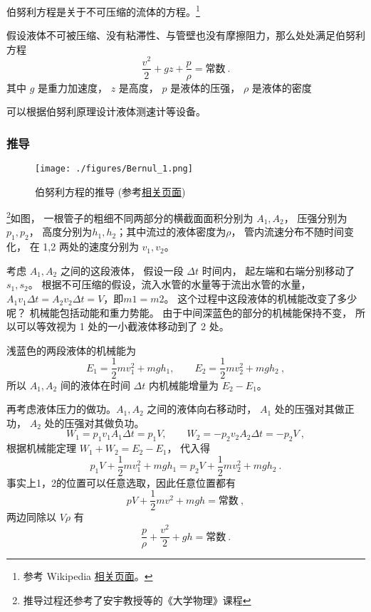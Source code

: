 

伯努利方程是关于不可压缩的流体的方程。\footnote{参考 Wikipedia \href{https://en.wikipedia.org/wiki/Bernoulli-principle}{相关页面}。}

假设液体不可被压缩、没有粘滞性、与管壁也没有摩擦阻力，那么处处满足伯努利方程
\begin{equation}
\frac{v^2}{2} + gz + \frac{p}{\rho} = \text{常数}~.
\end{equation}
其中 $g$ 是重力加速度， $z$ 是高度， $p$ 是液体的压强， $\rho$ 是液体的密度

可以根据伯努利原理设计液体测速计等设备。

\subsubsection{推导}

\begin{figure}[ht]
\centering
\texttt{[image: ./figures/Bernul\_1.png]}
\caption{伯努利方程的推导 (参考\href{https://en.wikipedia.org/wiki/Bernoulli-principle}{相关页面})}\label{Bernul_fig1}
\end{figure}
\footnote{推导过程还参考了安宇教授等的《大学物理》课程}如图， 一根管子的粗细不同两部分的横截面面积分别为 $A_1, A_2$， 压强分别为 $p_1, p_2$， 高度分别为$h_1, h_2$；其中流过的液体密度为$\rho$， 管内流速分布不随时间变化， 在  1,2 两处的速度分别为 $v_1, v_2$。

考虑 $A_1, A_2$ 之间的这段液体， 假设一段 $\Delta t$ 时间内， 起左端和右端分别移动了 $s_1, s_2$。
根据不可压缩的假设，流入水管的水量等于流出水管的水量，$A_1v_1\Delta t=A_2v_2\Delta t=V$，即$m1=m2$。 这个过程中这段液体的机械能改变了多少呢？ 机械能包括动能和重力势能。 由于中间深蓝色的部分的机械能保持不变， 所以可以等效视为 1 处的一小截液体移动到了 2 处。

浅蓝色的两段液体的机械能为
\begin{equation}
E_1=\frac{1}{2}mv_1^2+mgh_1, \qquad
E_2=\frac{1}{2}mv_2^2+mgh_2~,
\end{equation}
所以 $A_1,A_2$ 间的液体在时间 $\Delta t$ 内机械能增量为 $E_2 - E_1$。

再考虑液体压力的做功。$A_1,A_2$ 之间的液体向右移动时， $A_1$ 处的压强对其做正功， $A_2$ 处的压强对其做负功。
\begin{equation}
W_1=p_1v_1A_1\Delta t=p_1V, \qquad
W_2=-p_2v_2A_2 \Delta t=-p_2V ~,
\end{equation}
根据机械能定理 $W_1 + W_2 = E_2 - E_1$， 代入得
\begin{equation}
p_1V+\frac{1}{2}mv_1^2+mgh_1=p_2V+\frac{1}{2}mv_2^2+mgh_2~.
\end{equation}
事实上1，2的位置可以任意选取，因此任意位置都有
\begin{equation}
pV+\frac{1}{2}mv^2+mgh=\text{常数}~,
\end{equation}
两边同除以 $V\rho$ 有
\begin{equation}
\frac{p}{\rho} + \frac{v^2}{2} + gh = \text{常数}~.
\end{equation}

